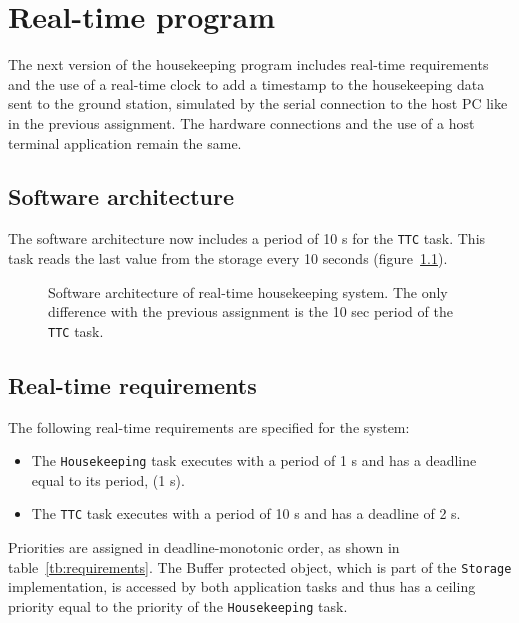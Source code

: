 \chapter{Real-time program}\label{ch:Assignment6}

The next version of the housekeeping program includes real-time requirements and the use of a real-time clock to add a timestamp to the housekeeping data sent to the ground station, simulated by the serial connection to the host PC like in the previous assignment. The hardware connections and the use of a host terminal application remain the same.

\section{Software architecture}

The software architecture now includes a period of 10 s for the {\tt TTC} task. This task reads the last value from the storage every 10 seconds (figure~\ref{fig:real-time}).

\begin{figure}[h]
            \caption{Software architecture of real-time housekeeping system. The only difference with the previous assignment is the 10 sec period of the {\tt TTC} task.}
            \label{fig:real-time}
\end{figure}

\section{Real-time requirements}

The following real-time requirements are specified for the system:
\begin{itemize}
\item The {\tt Housekeeping} task executes with a period of 1 s and has a deadline equal to its period, (1 s).
\item The {\tt TTC} task executes with a period of 10 s and has a deadline of 2 s.
\end{itemize}

Priorities are assigned in deadline-monotonic order, as shown in table~\ref{tb:requirements}. The Buffer protected object, which is part of the {\tt Storage} implementation, is accessed by both application tasks and thus has a ceiling priority equal to the priority of the {\tt Housekeeping} task.


